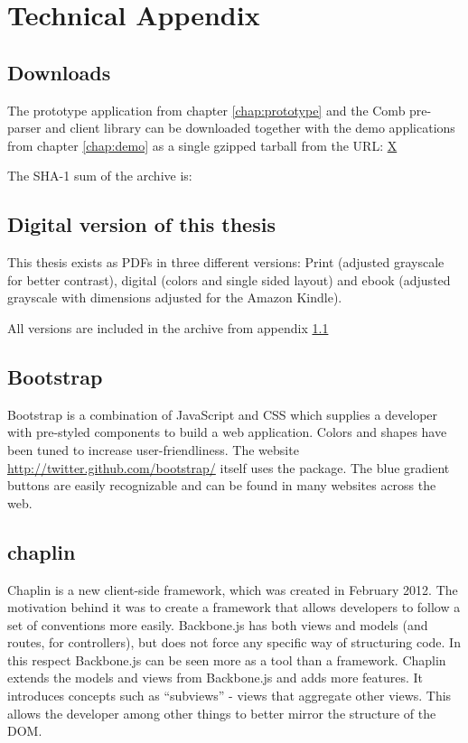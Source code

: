 \documentclass[thesis.tex]{subfiles}
\begin{document}
\chapter{Technical Appendix}

\section{Downloads}
\label{app:downloads}
The prototype application from chapter \ref{chap:prototype} and the Comb
pre-parser and client library can be downloaded together with
the demo applications from chapter \ref{chap:demo} as a single gzipped tarball
from the URL: \url{X}

The SHA-1 sum of the archive is: 


\section{Digital version of this thesis}
This thesis exists as PDFs in three different versions:
Print (adjusted grayscale for better contrast),
digital (colors and single sided layout) and
ebook (adjusted grayscale with dimensions adjusted for the Amazon Kindle).

All versions are included in the archive from appendix \ref{app:downloads}

\section{Bootstrap}
\label{app:bootstrap}
Bootstrap is a combination of JavaScript and CSS which supplies a developer
with pre-styled components to build a web application. Colors and shapes
have been tuned to increase user-friendliness.
The website \url{http://twitter.github.com/bootstrap/} itself uses the package.
The blue gradient buttons are easily recognizable and can be found in many
websites across the web.

\section{chaplin}
\label{app:chaplin}

Chaplin is a new client-side framework, which was created in February 2012.
The motivation behind it was to create a framework that allows developers to
follow a set of conventions more easily. Backbone.js has both views and models
(and routes, for controllers), but does not force any specific way of
structuring code. In this respect Backbone.js can be seen more as a tool than a
framework.
Chaplin extends the models and views from Backbone.js and adds more features.
It introduces concepts such as ``subviews'' - views that aggregate other views.
This allows the developer among other things to better mirror the structure of
the DOM.
\end{document}
